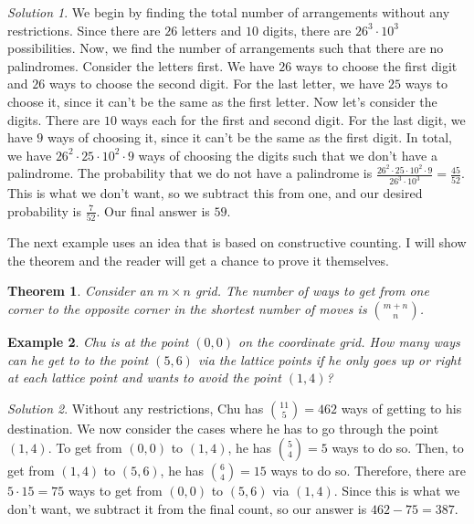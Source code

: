 \documentclass[letterpaper]{article}
\newtheorem{thm}{Theorem}[section]
\newtheorem{example}[thm]{Example}
\theoremstyle{remark}
\newtheorem*{solution}{Solution}
\theoremstyle{definition}
\begin{document}
\begin{solution}
We begin by finding the total number of arrangements without any restrictions. Since there are $26$ letters and $10$ digits, there are $26^3\cdot 10^3$ possibilities. Now, we find the number of arrangements such that there are no palindromes. Consider the letters first. We have $26$ ways to choose the first digit and $26$ ways to choose the second digit. For the last letter, we have $25$ ways to choose it, since it can't be the same as the first letter. Now let's consider the digits. There are $10$ ways each for the first and second digit. For the last digit, we have $9$ ways of choosing it, since it can't be the same as the first digit. In total, we have $26^2\cdot 25 \cdot 10^2 \cdot 9$ ways of choosing the digits such that we don't have a palindrome. The probability that we do not have a palindrome is $\frac{26^2\cdot 25\cdot 10^2 \cdot 9}{26^3\cdot 10^3}=\frac{45}{52}$. This is what we don't want, so we subtract this from one, and our desired probability is $\frac{7}{52}$. Our final answer is $59$.
\end{solution}

The next example uses an idea that is based on constructive counting. I will show the theorem and the reader will get a chance to prove it themselves.

\begin{thm}
Consider an $m \times n$ grid. The number of ways to get from one corner to the opposite corner in the shortest number of moves is $\binom{m+n}{n}$.
\end{thm}

\begin{example}
Chu is at the point $(0,0)$ on the coordinate grid. How many ways can he get to to the point $(5,6)$ via the lattice points if he only goes up or right at each lattice point and wants to avoid the point $(1,4)$?
\end{example}

\begin{solution}
Without any restrictions, Chu has $\binom{11}{5}=462$ ways of getting to his destination. We now consider the cases where he has to go through the point $(1,4).$ To get from $(0,0)$ to $(1,4)$, he has $\binom{5}{4}=5$ ways to do so. Then, to get from $(1,4)$ to $(5,6)$, he has $\binom{6}{4}=15$ ways to do so. Therefore, there are $5\cdot 15=75$ ways to get from $(0,0)$ to $(5,6)$ via $(1,4)$. Since this is what we don't want, we subtract it from the final count, so our answer is $462-75=387$.
\end{solution}
\end{document}
